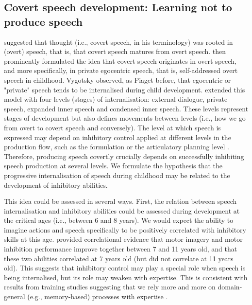 \documentclass[utf8]{template/frontiersSCNS} %
\begin{document}
\subsection{Covert speech development: Learning not to produce speech}

\cite{watson_psychology_1919} suggested that thought (i.e., covert speech, in his terminology) was rooted in (overt) speech, that is, that covert speech matures from overt speech. \cite{vygotsky_thought_1934} then prominently formulated the idea that covert speech originates in overt speech, and more specifically, in private egocentric speech, that is, self-addressed overt speech in childhood. Vygotsky observed, as Piaget before, that egocentric or "private" speech tends to be internalised during child development. \cite{fernyhough_alien_2004} extended this model with four levels (stages) of internalisation: external dialogue, private speech, expanded inner speech and condensed inner speech. These levels represent stages of development but also defines movements between levels (i.e., how we go from overt to covert speech and conversely). The level at which speech is expressed may depend on inhibitory control applied at different levels in the production flow, such as the formulation or the articulatory planning level \citep{grandchamp_condialint_2019}. Therefore, producing speech covertly crucially depends on successfully inhibiting speech production at several levels. We formulate the hypothesis that the progressive internalisation of speech during childhood may be related to the development of inhibitory abilities.

This idea could be assessed in several ways. First, the relation between speech internalisation and inhibitory abilities could be assessed during development at the critical ages (i.e., between 6 and 8 years). We would expect the ability to imagine actions and speech specifically to be positively correlated with inhibitory skills at this age. \cite{wang_relationship_2021} provided correlational evidence that motor imagery and motor inhibition performance improve together between 7 and 11 years old, and that these two abilities correlated at 7 years old (but did not correlate at 11 years old). This suggests that inhibitory control may play a special role when speech is being internalised, but its role may weaken with expertise. This is consistent with results from training studies suggesting that we rely more and more on domain-general (e.g., memory-based) processes with expertise \citep[e.g.,][]{tarr_mental_1989, jolicoeur_time_1985}.
\end{document}
